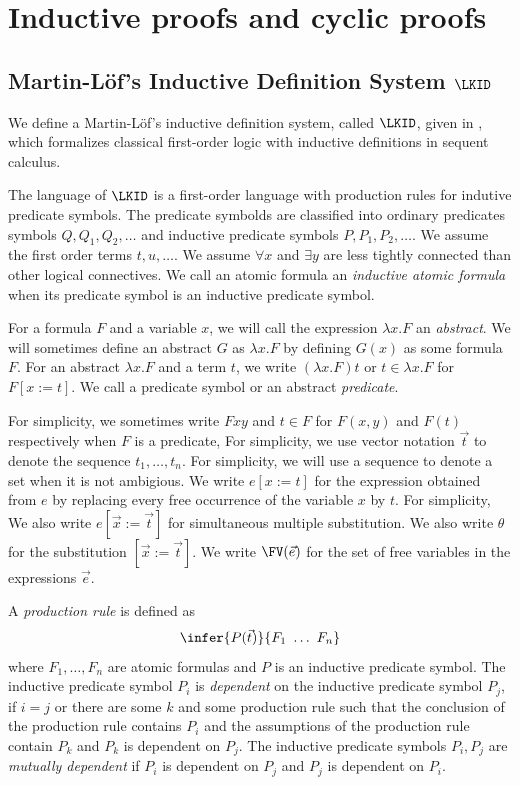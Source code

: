 \section{Inductive proofs and cyclic proofs}

\subsection{Martin-L\"of's Inductive Definition System $\LKID$}

We define
a Martin-L\"of's inductive definition system, called $\LKID$,
given in \cite{Brotherston11}, 
which formalizes classical first-order logic with inductive definitions
in sequent calculus.

The language of $\LKID$ is a first-order language with
production rules for indutive predicate symbols.
The predicate symbolds are classified into ordinary predicates symbols $Q,Q_1,Q_2,\ldots$
and inductive predicate symbols $P,P_1,P_2,\ldots$.
We assume the first order terms $t,u, \ldots$.
We assume $\forall x$ and $\exists y$ are less tightly connected than other
logical connectives.
We call an atomic formula an {\em inductive atomic formula}
when its predicate symbol is an inductive predicate symbol.

For a formula $F$ and a variable $x$,
we will call the expression $\lambda x.F$ an {\em abstract}.
We will sometimes define an abstract $G$ as $\lambda x.F$
by defining $G(x)$ as some formula $F$.
For an abstract $\lambda x.F$ and a term $t$,
we write $(\lambda x.F)t$ or $t \in \lambda x.F$ for $F[x:=t]$.
We call a predicate symbol or an abstract {\em predicate}.

For simplicity,
we sometimes write $Fxy$ and $t \in F$ for $F(x,y)$ and $F(t)$ respectively
when $F$ is a predicate,
For simplicity, we use vector notation $\Vec t$ to denote
the sequence $t_1,\ldots,t_n$.
For simplicity, we will use a sequence to denote a set when it is not ambigious.
We write $e[x:=t]$ for the expression obtained from $e$ by replacing
every free occurrence of the variable $x$ by $t$.
For simplicity,
We also write $e[\Vec x:=\Vec t]$ for simultaneous multiple substitution.
We also write $\theta$ for the substitution $[\Vec x:=\Vec t]$.
We write $\FV(\Vec e)$ for the set of free variables in the expressions $\Vec e$.

A {\em production rule} is defined as
\[
\infer{P(\Vec t)}{
F_1 \ \ldots \ F_n
}
\]
where $F_1,\ldots,F_n$ are atomic formulas and
$P$ is an inductive predicate symbol.
The inductive predicate symbol $P_i$ is {\em dependent} on 
the inductive predicate symbol $P_j$,
if
$i=j$ or
there are some $k$ and some production rule
such that 
the conclusion of the production rule contains $P_i$ and
the assumptions of the production rule contain $P_k$
and $P_k$ is dependent on $P_j$.
The inductive predicate symbols $P_i,P_j$ are {\em mutually dependent}
if $P_i$ is dependent on $P_j$ and $P_j$ is dependent on $P_i$.


